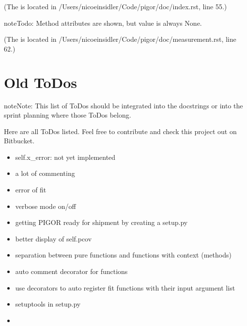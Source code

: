 \documentclass[letterpaper,10pt,english]{sphinxmanual}
\begin{document}
(The {\hyperref[\detokenize{index:index-0}]{}} is located in /Users/nicoeinsidler/Code/pigor/doc/index.rst, line 55.)

\begin{sphinxadmonition}{note}{Todo:}
Method attributes are shown, but value is always None.
\end{sphinxadmonition}

(The {\hyperref[\detokenize{measurement:index-0}]{}} is located in /Users/nicoeinsidler/Code/pigor/doc/measurement.rst, line 62.)


\chapter{Old ToDos}
\label{\detokenize{index:old-todos}}
\begin{sphinxadmonition}{note}{Note:}
This list of ToDos should be integrated into the docstrings or into the sprint planning where those ToDos belong.
\end{sphinxadmonition}

Here are all ToDos listed. Feel free to contribute and check this project out on Bitbucket.
\begin{itemize}
\item {} 
self.x\_error: not yet implemented

\item {} 
a lot of commenting

\item {} 
error of fit

\item {} 
verbose mode on/off

\item {} 
getting PIGOR ready for shipment by creating a setup.py

\item {} 
better display of self.pcov

\item {} 
separation between pure functions and functions with context (methods)

\item {} 
auto comment decorator for functions

\item {} 
use decorators to auto register fit functions with their input argument list

\item {} 
setuptools in setup.py

\item {} 

\end{itemize}
\end{document}
